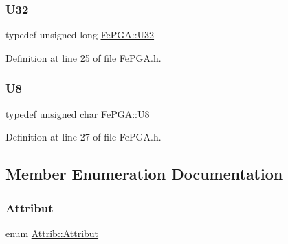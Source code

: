 \subsubsection{\texorpdfstring{U32}{U32}}
{\footnotesize\ttfamily typedef unsigned long \hyperlink{classFePGA_a1d44a0b27d13179bb1dceb5ec6f4cc1f}{Fe\+P\+G\+A\+::\+U32}}



Definition at line 25 of file Fe\+P\+G\+A.\+h.

\mbox{\label{classFePGA_ab65d84dbbc4b5711eb4d85d00c5abfa2}} 
\subsubsection{\texorpdfstring{U8}{U8}}
{\footnotesize\ttfamily typedef unsigned char \hyperlink{classFePGA_ab65d84dbbc4b5711eb4d85d00c5abfa2}{Fe\+P\+G\+A\+::\+U8}}



Definition at line 27 of file Fe\+P\+G\+A.\+h.



\subsection{Member Enumeration Documentation}
\mbox{\label{classAttrib_a69e171d7cc6417835a5a306d3c764235}} 
\subsubsection{\texorpdfstring{Attribut}{Attribut}}
{\footnotesize\ttfamily enum \hyperlink{classAttrib_a69e171d7cc6417835a5a306d3c764235}{Attrib\+::\+Attribut}\hspace{0.3cm}{\ttfamily [inherited]}}

